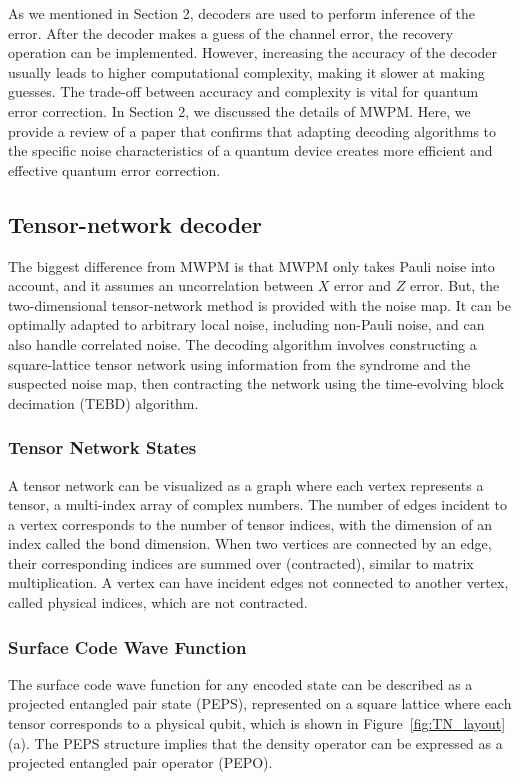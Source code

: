 As we mentioned in Section 2, decoders are used to perform inference of the error. After the decoder makes a guess of the channel error, the recovery operation can be implemented. However, increasing the accuracy of the decoder usually leads to higher computational complexity, making it slower at making guesses. The trade-off between accuracy and complexity is vital for quantum error correction. In Section 2, we discussed the details of MWPM. Here, we provide a review of a paper that confirms that adapting decoding algorithms to the specific noise characteristics of a quantum device creates more efficient and effective quantum error correction.

\subsection{Tensor-network decoder}

The biggest difference from MWPM is that MWPM only takes Pauli noise into account, and it assumes an uncorrelation between $X$ error and $Z$ error. But, the two-dimensional tensor-network method is provided with the noise map. It can be optimally adapted to arbitrary local noise, including non-Pauli noise, and can also handle correlated noise. The decoding algorithm involves constructing a square-lattice tensor network using information from the syndrome and the suspected noise map, then contracting the network using the time-evolving block decimation (TEBD) algorithm.

\subsubsection{Tensor Network States}

A tensor network can be visualized as a graph where each vertex represents a tensor, a multi-index array of complex numbers. The number of edges incident to a vertex corresponds to the number of tensor indices, with the dimension of an index called the bond dimension. When two vertices are connected by an edge, their corresponding indices are summed over (contracted), similar to matrix multiplication. A vertex can have incident edges not connected to another vertex, called physical indices, which are not contracted.

\subsubsection{Surface Code Wave Function}

The surface code wave function for any encoded state can be described as a projected entangled pair state (PEPS), represented on a square lattice where each tensor corresponds to a physical qubit, which is shown in Figure~\ref{fig:TN_layout}(a). The PEPS structure implies that the density operator can be expressed as a projected entangled pair operator (PEPO).
